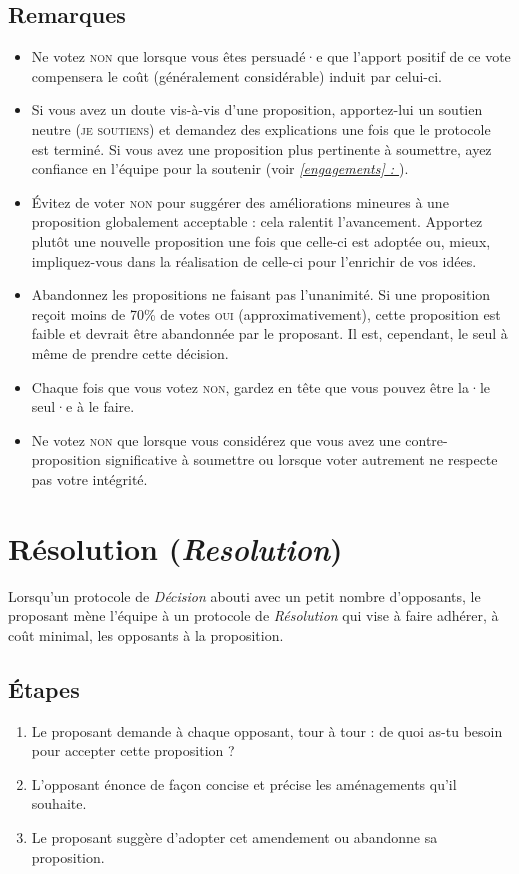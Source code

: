 \documentclass[11pt]{book}
\newcommand*{\fullref}[1]{\textit{\hyperref[{#1}]{\autoref*{#1} : \nameref*{#1}}}}
\let\oldsection\section
\renewcommand\section{\clearpage\oldsection}
\begin{document}
\subsection{Remarques}
\begin{itemize}
	\item Ne votez \textsc{non} que lorsque vous êtes persuadé·e que l'apport positif de ce vote compensera le coût (généralement considérable) induit par celui-ci.
	\item Si vous avez un doute vis-à-vis d'une proposition, apportez-lui un soutien neutre (\textsc{je soutiens}) et demandez des explications une fois que le
	      protocole est terminé. Si vous avez une proposition plus pertinente à soumettre, ayez confiance en l'équipe pour la soutenir (voir \fullref{engagements}).
	\item Évitez de voter \textsc{non} pour suggérer des améliorations mineures à une proposition globalement acceptable : cela ralentit l'avancement. Apportez
	      plutôt une nouvelle proposition une fois que celle-ci est adoptée ou, mieux, impliquez-vous dans la réalisation de celle-ci pour l'enrichir de vos idées.
	\item Abandonnez les propositions ne faisant pas l'unanimité. Si une proposition reçoit moins de 70\% de votes \textsc{oui} (approximativement), cette proposition
	      est faible et devrait être abandonnée par le proposant. Il est, cependant, le seul à même de prendre cette décision.
	\item Chaque fois que vous votez \textsc{non}, gardez en tête que vous pouvez être la·le seul·e à le faire.
	\item Ne votez \textsc{non} que lorsque vous considérez que vous avez une contre-proposition significative à soumettre ou lorsque voter autrement ne respecte pas
	      votre intégrité.
\end{itemize}

\section{Résolution (\emph{Resolution})} \label{protocole-resolution}

Lorsqu'un protocole de \emph{Décision} abouti avec un petit nombre d'opposants, le proposant mène l'équipe à un protocole de \emph{Résolution} qui vise à faire adhérer,
à coût minimal, les opposants à la proposition.

\subsection{Étapes}
\begin{enumerate}
	\item Le proposant demande à chaque opposant, tour à tour : \og{}de quoi as-tu besoin pour accepter cette proposition ?\fg{}
	\item L'opposant énonce de façon concise et précise les aménagements qu'il souhaite.
	\item Le proposant suggère d'adopter cet amendement ou abandonne sa proposition.
\end{enumerate}
\end{document}
